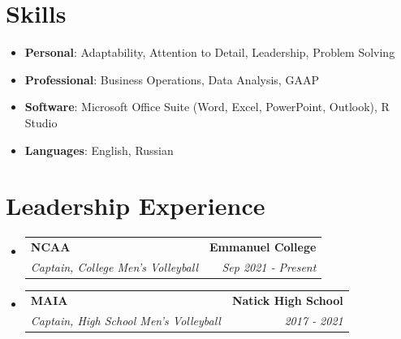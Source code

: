 \documentclass[letterpaper,]{article}
\makeatletter
\newcommand{\resumeItem}[2]{
  \item\small{
    \textbf{#1}{: #2 \vspace{-2pt}}
  }
}
\newcommand{\resumeSubheading}[4]{
  \vspace{-1pt}\item
    \begin{tabular*}{0.97\textwidth}[t]{l@{\extracolsep{\fill}}r}
      \textbf{#1} & #2 \\
      \textit{\small#3} & \textit{\small #4} \\
    \end{tabular*}
    \vspace{-5pt}
}
\newcommand{\resumeSubItem}[2]{\resumeItem{#1}{#2}\vspace{-4pt}}
\newcommand{\resumeSubHeadingListStart}{\begin{itemize}[leftmargin=*]}
\newcommand{\resumeSubHeadingListEnd}{\end{itemize}}
\makeatother
\begin{document}
\section{Skills}
  \resumeSubHeadingListStart
    
      \resumeSubItem{Personal}
        {Adaptability, Attention to Detail, Leadership, Problem Solving}
    
      \resumeSubItem{Professional}
        {Business Operations, Data Analysis, GAAP}

      \resumeSubItem{Software}
        {Microsoft Office Suite (Word, Excel, PowerPoint, Outlook), R Studio}
    
      \resumeSubItem{Languages}
        {English, Russian}

  \resumeSubHeadingListEnd
  
\section{Leadership Experience}
  \resumeSubHeadingListStart

    \resumeSubheading
      {NCAA}{\textbf {Emmanuel College}}
      {Captain, College Men's Volleyball}{Sep 2021 ‑ Present}

    \resumeSubheading
      {MAIA}{\textbf {Natick High School}}
      {Captain, High School Men's Volleyball}{2017 ‑ 2021}
    
  \resumeSubHeadingListEnd
\end{document}
